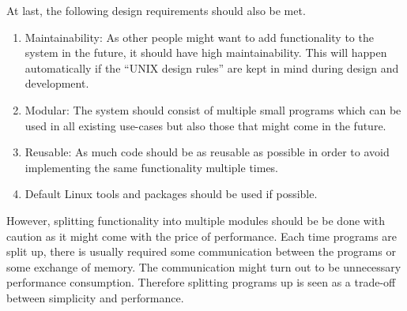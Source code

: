 \noindent At last, the following design requirements should also be met.


\begin{enumerate}[{(1)}]
	\item Maintainability: As other people might want to add functionality to the system in the future, it should have high maintainability. This will happen automatically if the ``UNIX design rules'' are kept in mind during design and development.

	\item Modular: The system should consist of multiple small programs which can be used in all existing use-cases but also those that might come in the future.

	\item Reusable: As much code should be as reusable as possible in order to avoid implementing the same functionality multiple times.

    \item Default Linux tools and packages should be used if possible.
\end{enumerate}

However, splitting functionality into multiple modules should be be done with caution as it might come with the price of performance. Each time programs are split up, there is usually required some communication between the programs or some exchange of memory. The communication might turn out to be unnecessary performance consumption. Therefore splitting programs up is seen as a trade-off between simplicity and performance.







